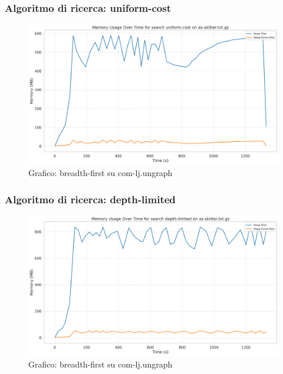 \documentclass{article}
\begin{document}
\subsubsection{Algoritmo di ricerca: uniform-cost}
\begin{figure}[h]\centering
\includegraphics[width=\textwidth]{../plots/as-skitter_uniform-cost.png}
\caption{Grafico: breadth-first su com-lj.ungraph}
\end{figure}
\subsubsection{Algoritmo di ricerca: depth-limited}
\begin{figure}[h]\centering
\includegraphics[width=\textwidth]{../plots/as-skitter_depth-limited.png}
\caption{Grafico: breadth-first su com-lj.ungraph}
\end{figure}
\end{document}
